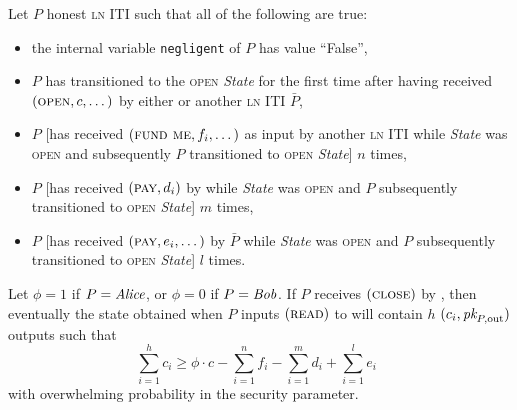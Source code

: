 \begin{lemma}
\label{lemma:real-balance-security}
  Let $P$ honest \textsc{ln} ITI such that all of the following are true:
  \begin{itemize}
    \item the internal variable \texttt{negligent} of $P$ has value ``False'',
    \item $P$ has transitioned to the \textsc{open} \textit{State} for the first
    time after having received $(\textsc{open}, c, \dots)$ by either
    \environment or another \textsc{ln} ITI $\bar{P}$,
    \item $P$ [has received $(\textsc{fund me}, f_i, \dots)$ as input by another
    \textsc{ln} ITI while \textit{State} was \textsc{open} and subsequently $P$
    transitioned to \textsc{open} \textit{State}] $n$ times,
    \item $P$ [has received $(\textsc{pay}, d_i)$ by \environment while
    \textit{State} was \textsc{open} and $P$ subsequently transitioned to
    \textsc{open} \textit{State}] $m$ times,
    \item $P$ [has received $(\textsc{pay}, e_i, \dots)$ by $\bar{P}$ while
    \textit{State} was \textsc{open} and $P$ subsequently transitioned to
    \textsc{open} \textit{State}] $l$ times.
  \end{itemize}
  Let $\phi = 1$ if $P = \mathit{Alice}$, or $\phi = 0$ if $P = \mathit{Bob}$. If $P$ receives
  $(\textsc{close})$ by \environment, then eventually the state obtained when
  $P$ inputs $(\textsc{read})$ to \ledger will contain $h$ $(c_i, \textit{pk}_{P,
  \mathrm{out}})$ outputs such that
  \begin{equation}
    \sum\limits_{i=1}^h c_i \geq \phi \cdot c - \sum\limits_{i=1}^n f_i -
    \sum\limits_{i=1}^m d_i + \sum\limits_{i=1}^l e_i \enspace
  \end{equation}
  with overwhelming probability in the security parameter.
\end{lemma}
